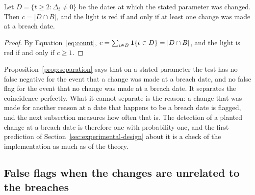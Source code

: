 \begin{proposition}
\label{prop:separation}
Let $D=\{t\ge 2:\Delta_t\ne 0\}$ be the dates at which the stated parameter was changed. Then $c=|D\cap B|$, and the light is red if and only if at least one change was made at a breach date.
\end{proposition}
\begin{proof}
By Equation~\eqref{eq:count}, $c=\sum_{t\in B}\mathbf{1}\{t\in D\}=|D\cap B|$, and the light is red if and only if $c\ge 1$.
\end{proof}
Proposition~\ref{prop:separation} says that on a stated parameter the test has no false negative for the event that a change was made at a breach date, and no false flag for the event that no change was made at a breach date. It separates the coincidence perfectly. What it cannot separate is the reason: a change that was made for another reason at a date that happens to be a breach date is flagged, and the next subsection measures how often that is. The detection of a planted change at a breach date is therefore one with probability one, and the first prediction of Section~\ref{sec:experimental-design} about it is a check of the implementation as much as of the theory.

\subsection{False flags when the changes are unrelated to the breaches}
\label{sec:theory-false}

